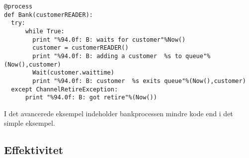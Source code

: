 \begin{lstlisting}[firstnumber=33 ,float=hbtp, label=fig:simulation_bank2, caption=Bankprocessen hvor banken er en begrænset ressource. ]
  @process
def Bank(customerREADER):
  try:
      while True:
        print "%94.0f: B: waits for customer"%Now()
        customer = customerREADER()
        print "%94.0f: B: adding a customer  %s to queue"%(Now(),customer)
        Wait(customer.waittime)
        print "%94.0f: B: customer  %s exits queue"%(Now(),customer)
  except ChannelRetireException:
      print "%94.0f: B: got retire"%(Now())

\end{lstlisting}
I det avancerede eksempel indeholder bankprocessen mindre kode end i det simple eksempel.
  
\subsection{Effektivitet}  

